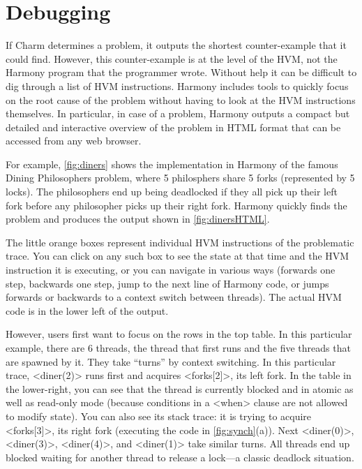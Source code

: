 \documentclass[twocolumn]{article}
\begin{document}
\section{Debugging}

If Charm determines a problem, it outputs the shortest counter-example that
it could find.  However, this counter-example is at the level of the HVM,
not the Harmony program that the programmer wrote.  Without help it can be
difficult to dig through a list of HVM instructions.
Harmony includes tools to quickly focus on the root cause of the
problem without having to look at the HVM instructions themselves.
In particular, in case of a problem, Harmony outputs a compact
but detailed and interactive overview of the problem in HTML format that
can be accessed from any web browser.

For example, \autoref{fig:diners} shows the implementation
in Harmony of the famous Dining Philosophers problem, where 5 philosphers
share 5 forks (represented by 5 locks).
The philosophers end up being deadlocked
if they all pick up their left fork before any philosopher picks up
their right fork.
Harmony quickly finds the problem and produces the output
shown in \autoref{fig:dinersHTML}.

The little orange boxes represent individual HVM instructions of the
problematic trace.  You can click on any such box to see the state
at that time and the HVM instruction it is executing,
or you can navigate in various ways (forwards one step,
backwards one step, jump to the next line of Harmony code, or jumps
forwards or backwards to a context switch between threads).  The actual
HVM code is in the lower left of the output.

However, users first want to focus on the rows in the top table.
In this particular example, there are 6 threads, the thread that
first runs and the five threads that are spawned by it.  They take
``turns'' by context switching.  In this particular trace, <{diner(2)}>
runs first and acquires <{forks[2]}>, its left fork.  In the table
in the lower-right, you can see that the thread is currently blocked
and in atomic as well as read-only mode (because conditions in a <{when}>
clause are not allowed to modify state).  You can also see its stack
trace: it is trying to acquire <{forks[3]}>, its right fork (executing
the code in \autoref{fig:synch}(a)).  Next <{diner(0)}>, <{diner(3)}>,
<{diner(4)}>, and <{diner(1)}> take similar turns.  All threads end up
blocked waiting for another thread to release a lock---a classic
deadlock situation.
\end{document}
